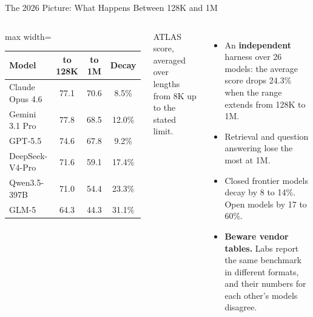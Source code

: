 \begin{frame}{The 2026 Picture: What Happens Between 128K and 1M}
    \begin{columns}[T,onlytextwidth]
        \centering
        \small
        \begin{adjustbox}{max width=\linewidth}\begin{tabular}{lccc}
            \toprule
            \textbf{Model} & \textbf{to 128K} & \textbf{to 1M} & \textbf{Decay} \\
            \midrule
            Claude Opus 4.6 & 77.1 & 70.6 & 8.5\% \\
            Gemini 3.1 Pro & 77.8 & 68.5 & 12.0\% \\
            GPT-5.5 & 74.6 & 67.8 & 9.2\% \\
            DeepSeek-V4-Pro & 71.6 & 59.1 & 17.4\% \\
            Qwen3.5-397B & 71.0 & 54.4 & 23.3\% \\
            GLM-5 & 64.3 & 44.3 & 31.1\% \\
            \bottomrule
        \end{tabular}\end{adjustbox}

        \vspace{0.3em}
        {\scriptsize ATLAS score, averaged over lengths from 8K up to the stated limit.}
        \begin{itemize}\itemsep0.45em
            \item An \textbf{independent} harness over 26 models: the average score drops \alert{24.3\%} when the range extends from 128K to 1M.
            \item Retrieval and question answering lose the most at 1M.
            \item Closed frontier models decay by 8 to 14\%. Open models by 17 to 60\%.
            \item \textbf{Beware vendor tables.} Labs report the same benchmark in different formats, and their numbers for each other's models disagree.
        \end{itemize}
    \end{columns}
    \vspace{0.4em}
\end{frame}

